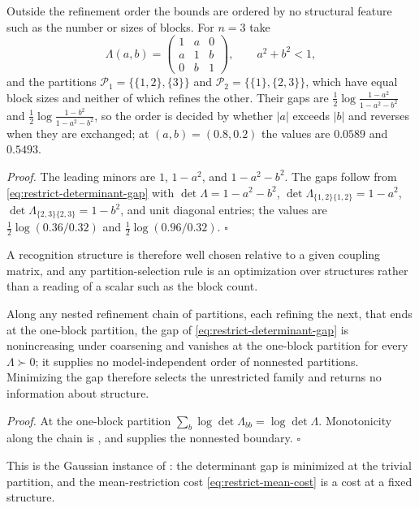 Outside the refinement order the bounds are ordered by no structural feature
such as the number or sizes of blocks. For \(n=3\) take
\begin{equation}
\Lambda(a,b)=\begin{pmatrix}1&a&0\\a&1&b\\0&b&1\end{pmatrix},
\qquad
a^2+b^2<1,
\label{eq:restrict-nonnested-witness}
\end{equation}
and the partitions \(\mathcal P_1=\{\{1,2\},\{3\}\}\) and
\(\mathcal P_2=\{\{1\},\{2,3\}\}\), which have equal block sizes and neither
of which refines the other. Their gaps are
\(\tfrac12\log\frac{1-a^2}{1-a^2-b^2}\) and \(\tfrac12\log\frac{1-b^2}{1-a^2-b^2}\),
so the order is decided by whether \(|a|\) exceeds \(|b|\) and reverses when
they are exchanged; at \((a,b)=(0.8,0.2)\) the values are \(0.0589\) and
\(0.5493\). 

\noindent\emph{Proof.}
The leading minors are \(1\), \(1-a^2\), and \(1-a^2-b^2\). The gaps follow from
\eqref{eq:restrict-determinant-gap} with \(\det\Lambda=1-a^2-b^2\),
\(\det\Lambda_{\{1,2\}\{1,2\}}=1-a^2\), \(\det\Lambda_{\{2,3\}\{2,3\}}=1-b^2\), and
unit diagonal entries; the values are \(\tfrac12\log(0.36/0.32)\) and
\(\tfrac12\log(0.96/0.32)\). \(\square\)

A recognition structure is therefore well chosen relative to a given coupling
matrix, and any partition-selection rule is an optimization over structures
rather than a reading of a scalar such as the block count.

Along any nested refinement chain of partitions, each refining the next, that
ends at the one-block partition, the gap of \eqref{eq:restrict-determinant-gap}
is nonincreasing under coarsening and vanishes at the one-block partition for
every \(\Lambda\succ0\); it supplies no model-independent order of nonnested partitions.
Minimizing the gap therefore selects the unrestricted family and returns no
information about structure. 

\noindent\emph{Proof.}
At the one-block partition \(\sum_b\log\det\Lambda_{bb}=\log\det\Lambda\).
Monotonicity along the chain is ,
and  supplies the nonnested boundary.
\(\square\)

This is the Gaussian instance of : the
determinant gap is minimized at the trivial partition, and the mean-restriction
cost \eqref{eq:restrict-mean-cost} is a cost at a fixed structure.
